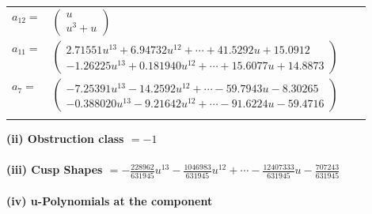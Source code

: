 \documentclass[1p]{elsarticle_modified}
\theoremstyle{definition}
\begin{document}
\begin{tabular}{m{7pt} m{180pt} m{7pt} m{180pt} }
\flushright $a_{12}=$&$\begin{pmatrix}u\\u^3+u\end{pmatrix}$ \\
\flushright $a_{11}=$&$\begin{pmatrix}2.71551 u^{13}+6.94732 u^{12}+\cdots+41.5292 u+15.0912\\-1.26225 u^{13}+0.181940 u^{12}+\cdots+15.6077 u+14.8873\end{pmatrix}$ \\
\flushright $a_{7}=$&$\begin{pmatrix}-7.25391 u^{13}-14.2592 u^{12}+\cdots-59.7943 u-8.30265\\-0.388020 u^{13}-9.21642 u^{12}+\cdots-91.6224 u-59.4716\end{pmatrix}$\\&\end{tabular}
\flushleft \textbf{(ii) Obstruction class $= -1$}\\~\\
\flushleft \textbf{(iii) Cusp Shapes $= -\frac{228962}{631945} u^{13}-\frac{1046983}{631945} u^{12}+\cdots-\frac{12407333}{631945} u-\frac{707243}{631945}$}\\~\\
\newpage\renewcommand{\arraystretch}{1}
\flushleft \textbf{(iv) u-Polynomials at the component}\newline \\
\end{document}
